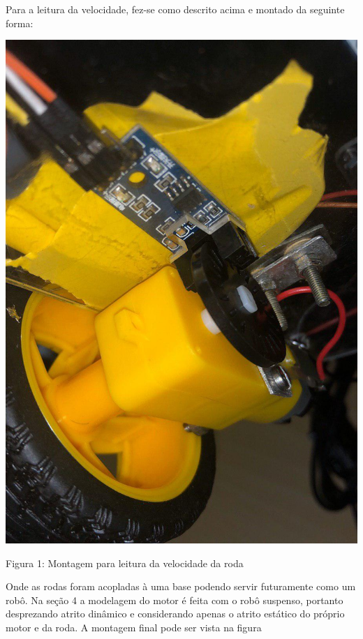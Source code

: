 \documentclass{article}
\begin{document}
Para a leitura da velocidade, fez-se como descrito acima e montado da seguinte forma:
\begin{center}
\centering
  \includegraphics[scale=0.15]{imagens/encoderRoda.jpg}
  
  \caption{Figura 1: Montagem para leitura da velocidade da roda}
\end{center}

Onde as rodas foram acopladas à uma base podendo servir futuramente como um robô. Na seção 4 a modelagem do motor é feita com o robô suspenso, portanto desprezando atrito dinâmico e considerando apenas o atrito estático do próprio motor e da roda. A montagem final pode ser vista na figura
\end{document}
